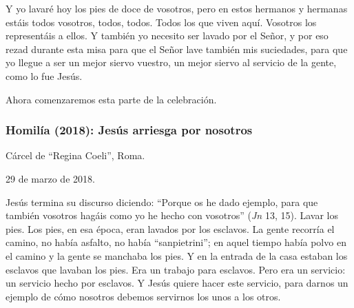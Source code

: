 			\begin{body}Y yo lavaré hoy los pies de doce de vosotros, pero en estos hermanos y hermanas estáis todos vosotros, todos, todos. Todos los que viven aquí. Vosotros los representáis a ellos. Y también yo necesito ser lavado por el Señor, y por eso rezad durante esta misa para que el Señor lave también mis suciedades, para que yo llegue a ser un mejor siervo vuestro, un mejor siervo al servicio de la gente, como lo fue Jesús.\end{body}
			
			\begin{body}Ahora comenzaremos esta parte de la celebración.\end{body}
			
			\subsubsection{Homilía (2018): Jesús arriesga por nosotros}
			
			\begin{referencia}Cárcel de “Regina Coeli”, Roma.\end{referencia}
			
			\begin{referencia}29 de marzo de 2018.\end{referencia}
			
			\begin{body}Jesús termina su discurso diciendo: “Porque os he dado ejemplo, para que también vosotros hagáis como yo he hecho con vosotros” (\textit{Jn} 13, 15). Lavar los pies. Los pies, en esa época, eran lavados por los esclavos. La gente recorría el camino, no había asfalto, no había “sanpietrini”; en aquel tiempo había polvo en el camino y la gente se manchaba los pies. Y en la entrada de la casa estaban los esclavos que lavaban los pies. Era un trabajo para esclavos. Pero era un servicio: un servicio hecho por esclavos. Y Jesús quiere hacer este servicio, para darnos un ejemplo de cómo nosotros debemos servirnos los unos a los otros. \end{body}
			
